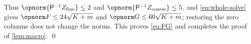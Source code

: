 Thus $\opnorm{\mathsf P^{-1}Z_{\mathrm{fine}}}\le2$ and
$\opnorm{\mathsf P^{-1}Z_{\mathrm{coarse}}}\le5$, and
\eqref{eq:whole-solve} gives $\opnorm F\le24\sqrt{K+m}$ and
$\opnorm G\le60\sqrt{K+m}$; restoring the zero columns does not change
the norms. This proves \eqref{eq:FG} and completes the proof of
\cref{lem:macro}.
\qed



